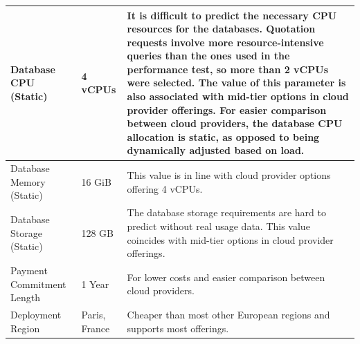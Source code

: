 \documentclass[12pt, reqno]{amsbook}
\theoremstyle{definition}
\theoremstyle{definition}
\numberwithin{section}{chapter}
\numberwithin{table}{chapter}
\numberwithin{figure}{chapter}
\begin{document}
\begin{longtable}{|M{70pt}|M{55pt}|m{300pt}|}
  \hline
  Database CPU (Static)
   & 4 vCPUs
   & It is difficult to predict the necessary \ac{CPU} resources for the databases. Quotation requests involve more resource-intensive queries than the ones used in the performance test, so more than 2 \acp{vCPU} were selected. The value of this parameter is also associated with mid-tier options in cloud provider offerings. For easier comparison between cloud providers, the database \ac{CPU} allocation is static, as opposed to being dynamically adjusted based on load. \\
  \hline
  Database Memory (Static)
   & 16 GiB
   & This value is in line with cloud provider options offering 4 \acp{vCPU}.                                                                                                                                                                                                                                                                                                                                                                                                            \\
  \hline
  Database Storage (Static)
   & 128 GB
   & The database storage requirements are hard to predict without real usage data. This value coincides with mid-tier options in cloud provider offerings.                                                                                                                                                                                                                                                                                                                              \\
  \hline
  Payment Commitment Length
   & 1 Year
   & For lower costs and easier comparison between cloud providers.                                                                                                                                                                                                                                                                                                                                                                                                                      \\
  \hline
  Deployment Region
   & Paris, France
   & Cheaper than most other European regions and supports most offerings.                                                                                                                                                                                                                                                                                                                                                                                                               \\

\end{longtable}
\end{document}

